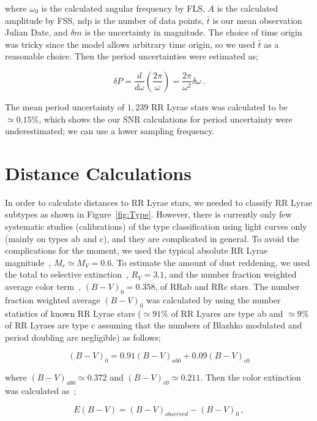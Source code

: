 \documentclass[aps,prb,twocolumn,superscriptaddress]{revtex4-1}
\begin{document}
\noindent where $\omega_0$ is the calculated angular frequency by FLS, $A$ is the calculated amplitude by FSS, ndp is the number of data points, $\bar{t}$ is our mean observation Julian Date, and $\delta m$ is the uncertainty in magnitude. The choice of time origin was tricky since the model allows arbitrary time origin, so we used $\bar{t}$ as a reasonable choice. Then the period uncertainties were estimated as;


\begin{equation}
\label{PEE}
\delta P = \frac{d}{d\omega} \left(\frac{2\pi}{\omega} \right) = \frac{2\pi}{\omega^2} \delta \omega \, .
\end{equation}

\indent The mean period uncertainty of $1,239$ RR Lyrae stars was calculated to be $\simeq 0.15 \%$, which shows the our SNR calculations for period uncertainty were underestimated; we can use a lower sampling frequency.


\section{Distance Calculations}

In order to calculate distances to RR Lyrae stars, we needed to classify RR Lyrae subtypes as shown in Figure~\ref{fig:Type}. However, there is currently only few systematic studies (calibrations) of the type classification using light curves only (mainly on types ab and c), and they are complicated in general. To avoid the complications for the moment, we used the typical absolute RR Lyrae magnitude~\citep{PSdata}, $M_r \simeq M_V = 0.6$. To estimate the amount of dust reddening, we used the total to selective extinction~\citep{Rv}, $R_V=3.1$, and the number fraction weighted average color term~\citep{EBV}, $(B-V)_0 = 0.358$, of RRab and RRc stars. The number fraction weighted average $(B-V)_0$ was calculated by using the number statistics of known RR Lyrae stars ($\simeq91\%$ of RR Lyares are type ab and $\simeq9\%$ of RR Lyraes are type c assuming that the numbers of Blazhko modulated and period doubling are negligible) as follows;

\begin{equation}
\label{BV}
(B-V)_0 = 0.91(B-V)_{ab0} + 0.09(B-V)_{c0}
\end{equation}

\noindent where $(B-V)_{ab0} \simeq 0.372$ and $(B-V)_{c0} \simeq 0.211$. Then the color extinction was calculated as~\cite{Modern};

\begin{equation}
\label{EBV}
E(B-V) = (B-V)_{observed} - (B-V)_0 \, ,
\end{equation}
\end{document}
